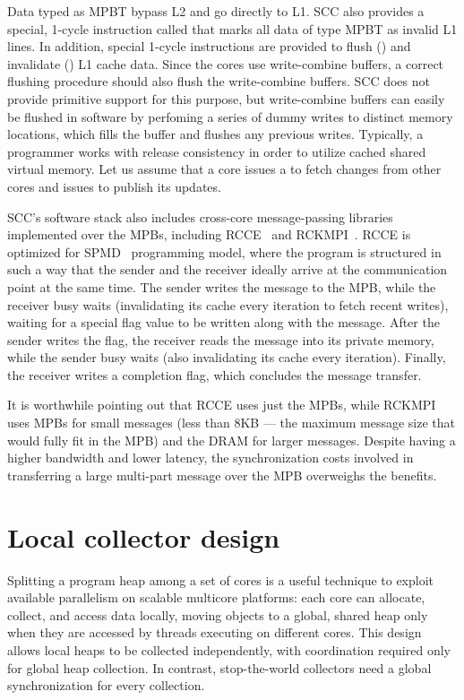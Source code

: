 Data typed as MPBT bypass L2 and go directly to L1. SCC also provides a
special, 1-cycle instruction called  that marks all data of type
MPBT as invalid L1 lines. In addition, special 1-cycle instructions are
provided to flush () and invalidate () L1 cache data.
Since the cores use write-combine buffers, a correct flushing procedure should
also flush the write-combine buffers. SCC does not provide primitive support
for this purpose, but write-combine buffers can easily be flushed in software
by perfoming a series of dummy writes to distinct memory locations, which fills
the buffer and flushes any previous writes. Typically, a programmer works with
release consistency in order to utilize cached shared virtual memory. Let us
assume that a core issues a  to fetch changes from other cores
and issues  to publish its updates.

SCC's software stack also includes cross-core message-passing libraries
implemented over the MPBs, including RCCE~\cite{Mattson2010} and
RCKMPI~\cite{Urena2011}. RCCE is optimized for SPMD~\cite{} programming model,
where the program is structured in such a way that the sender and the receiver
ideally arrive at the communication point at the same time. The sender writes
the message to the MPB, while the receiver busy waits (invalidating its cache
every iteration to fetch recent writes), waiting for a special flag value to be
written along with the message. After the sender writes the flag, the receiver
reads the message into its private memory, while the sender busy waits (also
invalidating its cache every iteration). Finally, the receiver writes a
completion flag, which concludes the message transfer.

It is worthwhile pointing out that RCCE uses just the MPBs, while RCKMPI uses
MPBs for small messages (less than 8KB --- the maximum message size that would
fully fit in the MPB) and the DRAM for larger messages. Despite having a higher
bandwidth and lower latency, the synchronization costs involved in transferring
a large multi-part message over the MPB overweighs the benefits.

\section{Local collector design}

Splitting a program heap among a set of cores is a useful technique to exploit
available parallelism on scalable multicore platforms: each core can allocate,
collect, and access data locally, moving objects to a global, shared heap only
when they are accessed by threads executing on different cores. This design
allows local heaps to be collected independently, with coordination required
only for global heap collection. In contrast, stop-the-world collectors need a
global synchronization for every collection.

